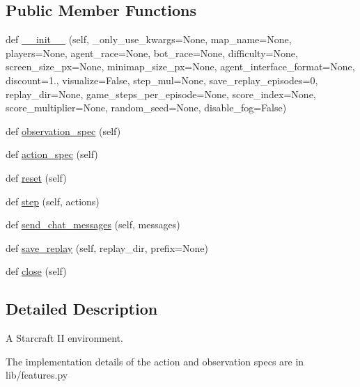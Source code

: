 \subsection*{Public Member Functions}
\begin{DoxyCompactItemize}
\item 
def \mbox{\hyperlink{classpysc2_1_1env_1_1sc2__env_1_1_s_c2_env_ac2a49052b728228f1ed327d31ab37fcc}{\+\_\+\+\_\+init\+\_\+\+\_\+}} (self, \+\_\+only\+\_\+use\+\_\+kwargs=None, map\+\_\+name=None, players=None, agent\+\_\+race=None, bot\+\_\+race=None, difficulty=None, screen\+\_\+size\+\_\+px=None, minimap\+\_\+size\+\_\+px=None, agent\+\_\+interface\+\_\+format=None, discount=1., visualize=False, step\+\_\+mul=None, save\+\_\+replay\+\_\+episodes=0, replay\+\_\+dir=None, game\+\_\+steps\+\_\+per\+\_\+episode=None, score\+\_\+index=None, score\+\_\+multiplier=None, random\+\_\+seed=None, disable\+\_\+fog=False)
\item 
def \mbox{\hyperlink{classpysc2_1_1env_1_1sc2__env_1_1_s_c2_env_a37bf2e2d461e4268feaa30862cd520cb}{observation\+\_\+spec}} (self)
\item 
def \mbox{\hyperlink{classpysc2_1_1env_1_1sc2__env_1_1_s_c2_env_af686189f9be833a222756233fed0191f}{action\+\_\+spec}} (self)
\item 
def \mbox{\hyperlink{classpysc2_1_1env_1_1sc2__env_1_1_s_c2_env_a11123fe4b74625eca2d88a2b837d681f}{reset}} (self)
\item 
def \mbox{\hyperlink{classpysc2_1_1env_1_1sc2__env_1_1_s_c2_env_afde565357f8e64e50a8e03df0c1a1d4c}{step}} (self, actions)
\item 
def \mbox{\hyperlink{classpysc2_1_1env_1_1sc2__env_1_1_s_c2_env_aa4cf7a2cf39426085b9d14ef2ecac855}{send\+\_\+chat\+\_\+messages}} (self, messages)
\item 
def \mbox{\hyperlink{classpysc2_1_1env_1_1sc2__env_1_1_s_c2_env_a55d7cb43c5efffa9cc249a5fd37cfba6}{save\+\_\+replay}} (self, replay\+\_\+dir, prefix=None)
\item 
def \mbox{\hyperlink{classpysc2_1_1env_1_1sc2__env_1_1_s_c2_env_a87aad830e9c5bb6741e3774e685766ae}{close}} (self)
\end{DoxyCompactItemize}


\subsection{Detailed Description}
\begin{DoxyVerb}A Starcraft II environment.

The implementation details of the action and observation specs are in
lib/features.py
\end{DoxyVerb}
 

